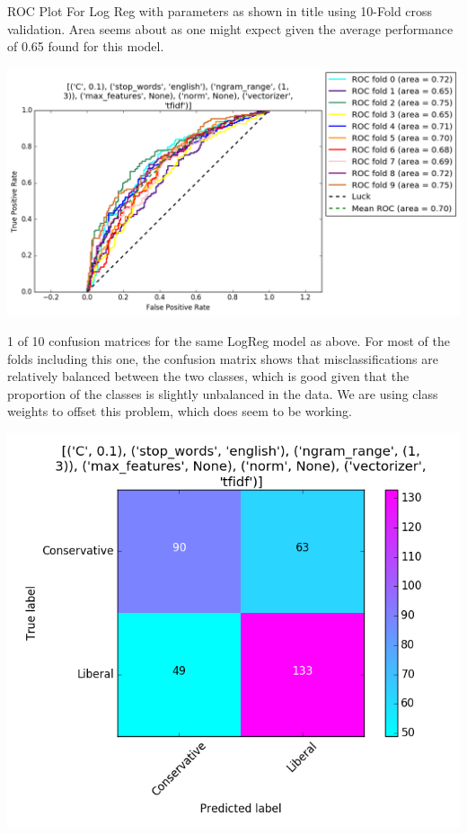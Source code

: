 \documentclass[11pt]{article}
\begin{document}
ROC Plot For Log Reg with parameters as shown in title using 10-Fold cross validation. Area seems about as one might expect given the average performance of 0.65 found for this model. 

\includegraphics[scale=0.65]{UpdateVis/ROCPlot}

1 of 10 confusion matrices for the same LogReg model as above. For most of the folds including this one, the confusion matrix shows that misclassifications are relatively balanced between the two classes, which is good given that the proportion of the classes is slightly unbalanced in the data. We are using class weights to offset this problem, which does seem to be working.

\includegraphics[scale=0.65]{UpdateVis/cm_fold9.png}
\end{document}
